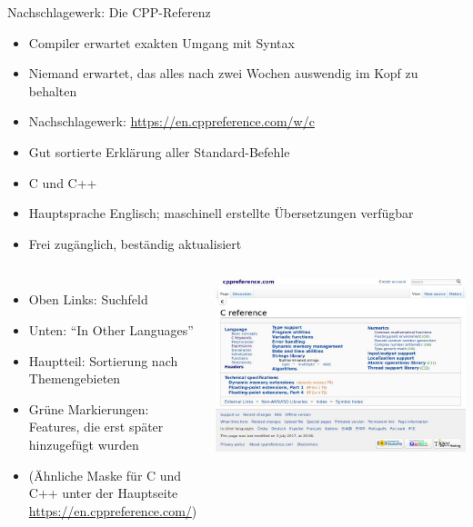 
\begin{frame}{Nachschlagewerk: Die CPP-Referenz}
%
\begin{itemize}
\item Compiler erwartet exakten Umgang mit Syntax
\item Niemand erwartet, das alles nach zwei Wochen auswendig im Kopf zu behalten
\item Nachschlagewerk: \url{https://en.cppreference.com/w/c}
\item Gut sortierte Erklärung aller Standard-Befehle
\item C und C++
\item Hauptsprache Englisch; maschinell erstellte Übersetzungen verfügbar
\item Frei zugänglich, beständig aktualisiert
\end{itemize}
%
\end{frame}


\begin{frame}
%
\begin{columns}[T]
\begin{itemize}
\item Oben Links: Suchfeld
\item Unten: \enquote{In Other Languages}
\item Hauptteil: Sortierung nach Themengebieten
\item Grüne Markierungen: Features, die erst später hinzugefügt wurden
\item (Ähnliche Maske für C und C++ unter der Hauptseite \url{https://en.cppreference.com/})
\end{itemize}
%
\includegraphics[width=\linewidth]{./gfx/cpp-home}
\end{columns}
%
\end{frame}

